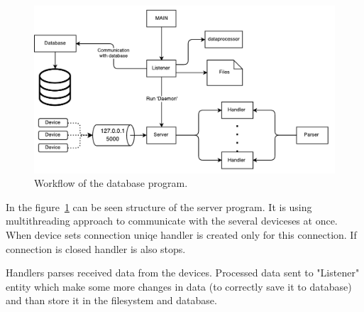 \documentclass[12pt]{article}
\begin{document}
\begin{figure}[htb!]
    \includegraphics[width=1\textwidth]{./images/database_flow.pdf}
    \caption{Workflow of the database program.}
    \label{fig:database_flow}
    \centering
\end{figure}

\par In the figure~\ref{fig:database_flow} can be seen structure of the server
program. It is using multithreading approach to communicate with the several
deviceses at once. When device sets connection uniqe handler is created only
for this connection. If connection is closed handler is also stops.
\par Handlers parses received data from the devices. Processed data sent to
"Listener" entity which make some more changes in data (to correctly save it to
database) and than store it in the filesystem and database.
\end{document}
